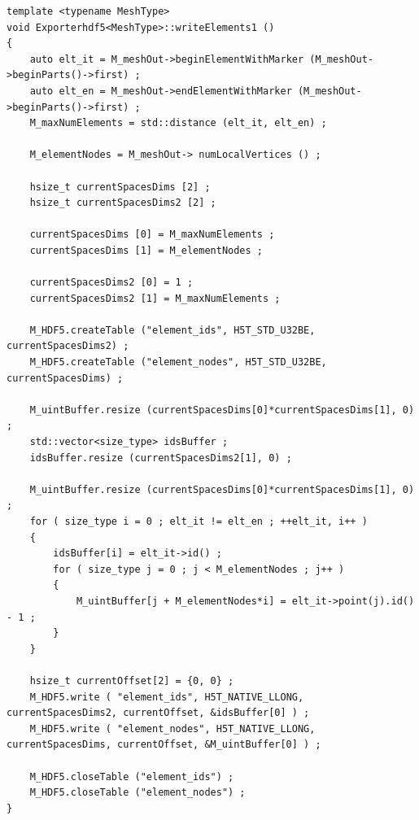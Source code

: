 \documentclass[12pt]{article}
\begin{document}
\begin{lstlisting}
template <typename MeshType>
void Exporterhdf5<MeshType>::writeElements1 () 
{
    auto elt_it = M_meshOut->beginElementWithMarker (M_meshOut->beginParts()->first) ;
    auto elt_en = M_meshOut->endElementWithMarker (M_meshOut->beginParts()->first) ;
    M_maxNumElements = std::distance (elt_it, elt_en) ;

    M_elementNodes = M_meshOut-> numLocalVertices () ;

    hsize_t currentSpacesDims [2] ;
    hsize_t currentSpacesDims2 [2] ;

    currentSpacesDims [0] = M_maxNumElements ;
    currentSpacesDims [1] = M_elementNodes ;

    currentSpacesDims2 [0] = 1 ;
    currentSpacesDims2 [1] = M_maxNumElements ;

    M_HDF5.createTable ("element_ids", H5T_STD_U32BE, currentSpacesDims2) ;
    M_HDF5.createTable ("element_nodes", H5T_STD_U32BE, currentSpacesDims) ;

    M_uintBuffer.resize (currentSpacesDims[0]*currentSpacesDims[1], 0) ;
    std::vector<size_type> idsBuffer ;
    idsBuffer.resize (currentSpacesDims2[1], 0) ;

    M_uintBuffer.resize (currentSpacesDims[0]*currentSpacesDims[1], 0) ;
    for ( size_type i = 0 ; elt_it != elt_en ; ++elt_it, i++ ) 
    {
        idsBuffer[i] = elt_it->id() ;
        for ( size_type j = 0 ; j < M_elementNodes ; j++ ) 
        {
            M_uintBuffer[j + M_elementNodes*i] = elt_it->point(j).id() - 1 ;
        }
    }

    hsize_t currentOffset[2] = {0, 0} ;
    M_HDF5.write ( "element_ids", H5T_NATIVE_LLONG, currentSpacesDims2, currentOffset, &idsBuffer[0] ) ;
    M_HDF5.write ( "element_nodes", H5T_NATIVE_LLONG, currentSpacesDims, currentOffset, &M_uintBuffer[0] ) ;

    M_HDF5.closeTable ("element_ids") ;
    M_HDF5.closeTable ("element_nodes") ;
}
\end{lstlisting}
\end{document}

